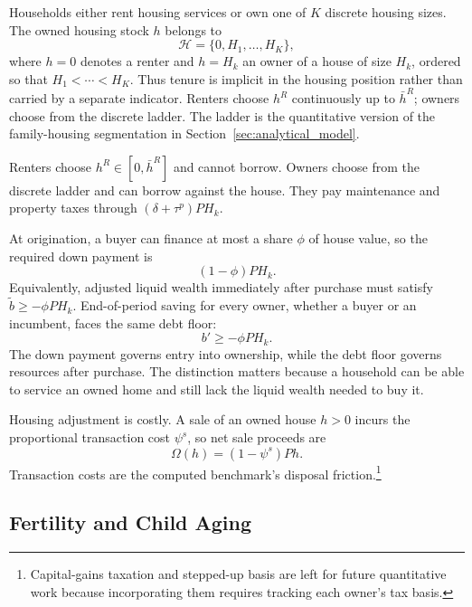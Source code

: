 \documentclass[11pt]{article}
\theoremstyle{definition}
\newcommand{\1}{\mathbf 1}
\newcommand{\HH}{\mathcal H}
\begin{document}
Households either rent housing services or own one of $K$ discrete housing
sizes. The owned housing stock $h$ belongs to
\begin{equation}
\HH=\{0,H_1,\ldots,H_K\},
\label{eq:quant_housing_set}
\end{equation}
where $h=0$ denotes a renter and $h=H_k$ an owner of a house of size $H_k$,
ordered so that $H_1<\cdots<H_K$. Thus tenure is implicit in the housing
position rather than carried by a separate indicator. Renters choose $h^R$
continuously up to $\bar h^R$; owners choose from the discrete ladder. The
ladder is the quantitative version of the family-housing segmentation in
Section~\ref{sec:analytical_model}.

Renters choose $h^R\in[0,\bar h^R]$ and cannot borrow. Owners choose from the
discrete ladder and can borrow against the house. They pay maintenance and
property taxes through $(\delta+\tau^p)PH_k$.

At origination, a buyer can finance at most a share $\phi$ of house value, so the
required down payment is
\begin{equation}
    (1-\phi)PH_k.
\label{eq:quant_dp}
\end{equation}
Equivalently, adjusted liquid wealth immediately after purchase must satisfy
$\tilde b\ge-\phi PH_k$. End-of-period saving for every owner, whether a buyer
or an incumbent, faces the same debt floor:
\begin{equation}
b'\ge -\phi P H_k.
\label{eq:quant_ltv}
\end{equation}
The down payment governs entry into ownership, while the debt floor governs
resources after purchase. The distinction matters because a household can be
able to service an owned home and still lack the liquid wealth needed to buy it.

Housing adjustment is costly. A sale of an owned house $h>0$ incurs the
proportional transaction cost $\psi^s$, so net sale proceeds are
\begin{equation}
\Omega(h)
=(1-\psi^s)Ph.
\label{eq:quant_sale_proceeds}
\end{equation}
Transaction costs are the computed benchmark's disposal
friction.\footnote{Capital-gains taxation and stepped-up basis are left for
future quantitative work because incorporating them requires tracking each
owner's tax basis.}

\subsection{Fertility and Child Aging}
\end{document}
